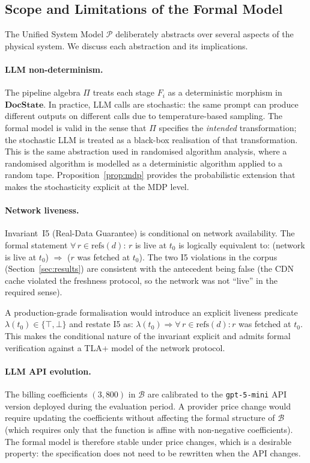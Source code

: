 \subsection{Scope and Limitations of the Formal Model}

The Unified System Model $\mathcal{P}$ deliberately abstracts over several aspects
of the physical system.
We discuss each abstraction and its implications.

\paragraph{LLM non-determinism.}
The pipeline algebra $\Pi$ treats each stage $F_i$ as a deterministic morphism in
$\mathbf{DocState}$.
In practice, LLM calls are stochastic: the same prompt can produce different outputs
on different calls due to temperature-based sampling.
The formal model is valid in the sense that $\Pi$ specifies the \emph{intended}
transformation; the stochastic LLM is treated as a black-box realisation of that
transformation.
This is the same abstraction used in randomised algorithm analysis, where a
randomised algorithm is modelled as a deterministic algorithm applied to a random
tape.
Proposition~\ref{prop:mdp} provides the probabilistic extension that makes the
stochasticity explicit at the MDP level.

\paragraph{Network liveness.}
Invariant~I5 (Real-Data Guarantee) is conditional on network availability.
The formal statement $\forall\,r\in\mathrm{refs}(d)$: $r$ is live at $t_0$
is logically equivalent to: (network is live at $t_0$) $\Rightarrow$ ($r$ was fetched
at $t_0$).
The two I5 violations in the corpus (Section~\ref{sec:results}) are consistent with
the antecedent being false (the CDN cache violated the freshness protocol, so the
network was not ``live'' in the required sense).

A production-grade formalisation would introduce an explicit liveness predicate
$\lambda(t_0)\in\{\top,\bot\}$ and restate I5 as:
$\lambda(t_0)\Rightarrow\forall\,r\in\mathrm{refs}(d): r$ was fetched at $t_0$.
This makes the conditional nature of the invariant explicit and admits formal
verification against a TLA+ model of the network protocol.

\paragraph{LLM API evolution.}
The billing coefficients $(3, 800)$ in $\mathcal{B}$ are calibrated to the
\texttt{gpt-5-mini} API version deployed during the evaluation period.
A provider price change would require updating the coefficients without affecting
the formal structure of $\mathcal{B}$ (which requires only that the function is
affine with non-negative coefficients).
The formal model is therefore stable under price changes, which is a desirable
property: the specification does not need to be rewritten when the API changes.

